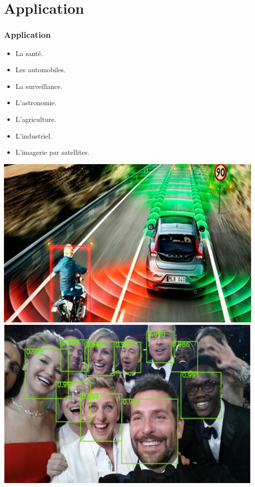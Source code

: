 \documentclass[11pt]{beamer}
\begin{document}
\section{Application}
\begin{frame}
\frametitle{Application}
\begin{minipage}{0.4\textwidth}
	\begin{flushright}
		\begin{itemize}
		\item La santé.
		\item Les automobiles.
		\item La surveillance.
		\item L'astronomie.
		\item L'agriculture.
		\item L'industriel.
		\item L'imagerie par satellites.
		\end{itemize}
	\end{flushright}
\end{minipage}
\begin{center}
\includegraphics[scale=0.1]{img4.png}
\includegraphics[scale=0.1]{img5.png}

\end{center}
\end{frame}
\end{document}

